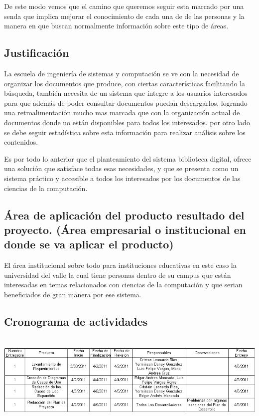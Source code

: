 \documentclass[]{article}
\begin{document}
	De este modo vemos que el camino que queremos seguir esta marcado por una senda que implica
	mejorar el conocimiento de cada una de de las personas y la manera en que buscan normalmente
	información sobre este tipo de áreas.	
	
	\subsection{Justificación}
	La escuela de ingeniería de sistemas y computación se ve con la necesidad de organizar los
	documentos que produce, con ciertas características facilitando la búsqueda, también necesita de
	un sistema que integre a los usuarios interesados para que además de poder consultar documentos
	puedan descargarlos, logrando una retroalimentación mucho mas marcada que con la organización
	actual de documentos donde no están disponibles para todos los interesados. por otro lado se debe
	seguir estadística sobre esta información para realizar análisis sobre los contenidos.

	Es por todo lo anterior que el planteamiento del sistema biblioteca digital, ofrece una solución
	que  satisface todas esas necesidades, y que se presenta como un sistema práctico y accesible a
	todos los interesados por los documentos de las ciencias de la computación.
	
	\subsection{Área de aplicación del producto resultado del proyecto. (Área empresarial o
	institucional en donde se va aplicar el producto)}
	El área institucional sobre todo para instituciones educativas en este caso la universidad del
	valle la cual tiene personas dentro de su campus que están interesadas en temas relacionados con
	ciencias de la computación y que serian beneficiados de gran manera por ese sistema.
	
	\subsection{Cronograma de actividades}
	\begin{minipage}[c]{1\linewidth}
		\centering
		\includegraphics[width=16cm, height=4.5cm]{Cronograma}
	\end{minipage}
	
\end{document}
